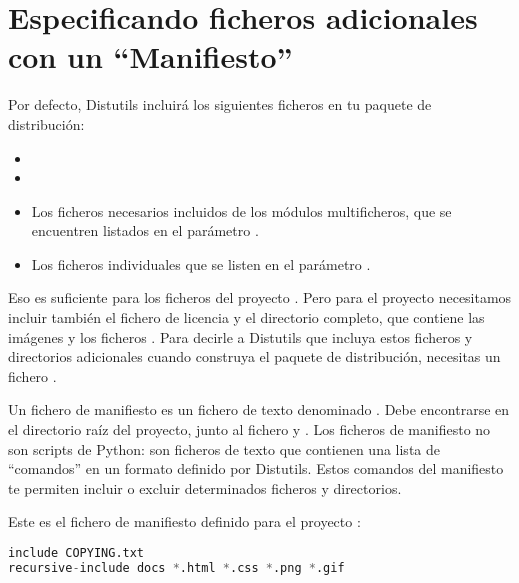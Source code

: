 \section{Especificando ficheros adicionales con un ``Manifiesto''}

Por defecto, Distutils incluirá los siguientes ficheros en tu paquete de distribución:

\begin{itemize}
  \item {}
  \item {}
  \item Los ficheros  necesarios incluidos de los módulos multificheros, que se encuentren listados en el parámetro .
  \item Los ficheros  individuales que se listen en el parámetro .
\end{itemize}

Eso es suficiente para los ficheros del proyecto . Pero para el proyecto  necesitamos incluir también el fichero de licencia  y el directorio  completo, que contiene las imágenes y los ficheros . Para decirle a Distutils que incluya estos ficheros y directorios adicionales cuando construya el paquete de distribución, necesitas un fichero .

Un fichero de manifiesto es un fichero de texto denominado . Debe encontrarse en el directorio raíz del proyecto, junto al fichero  y . Los ficheros de manifiesto no son scripts de Python: son ficheros de texto que contienen una lista de ``comandos'' en un formato definido por Distutils. Estos comandos del manifiesto te permiten incluir o excluir determinados ficheros y directorios.

Este es el fichero de manifiesto definido para el proyecto :

\begin{lstlisting}[language=Python,breaklines=true]
include COPYING.txt
recursive-include docs *.html *.css *.png *.gif
\end{lstlisting}

